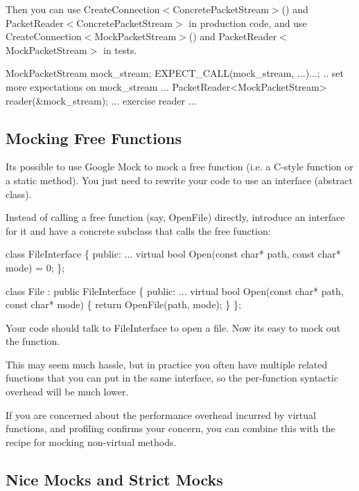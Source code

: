 Then you can use {\ttfamily Create\+Connection$<$Concrete\+Packet\+Stream$>$()} and {\ttfamily Packet\+Reader$<$Concrete\+Packet\+Stream$>$} in production code, and use {\ttfamily Create\+Connection$<$Mock\+Packet\+Stream$>$()} and {\ttfamily Packet\+Reader$<$Mock\+Packet\+Stream$>$} in tests.


\begin{DoxyCode}
MockPacketStream mock\_stream;
EXPECT\_CALL(mock\_stream, ...)...;
.. set more expectations on mock\_stream ...
PacketReader<MockPacketStream> reader(&mock\_stream);
... exercise reader ...
\end{DoxyCode}


\subsection*{Mocking Free Functions}

It\textquotesingle{}s possible to use Google Mock to mock a free function (i.\+e. a C-\/style function or a static method). You just need to rewrite your code to use an interface (abstract class).

Instead of calling a free function (say, {\ttfamily Open\+File}) directly, introduce an interface for it and have a concrete subclass that calls the free function\+:


\begin{DoxyCode}
class FileInterface \{
 public:
  ...
  virtual bool Open(const char* path, const char* mode) = 0;
\};

class File : public FileInterface \{
 public:
  ...
  virtual bool Open(const char* path, const char* mode) \{
    return OpenFile(path, mode);
  \}
\};
\end{DoxyCode}


Your code should talk to {\ttfamily File\+Interface} to open a file. Now it\textquotesingle{}s easy to mock out the function.

This may seem much hassle, but in practice you often have multiple related functions that you can put in the same interface, so the per-\/function syntactic overhead will be much lower.

If you are concerned about the performance overhead incurred by virtual functions, and profiling confirms your concern, you can combine this with the recipe for mocking non-\/virtual methods.

\subsection*{Nice Mocks and Strict Mocks}

